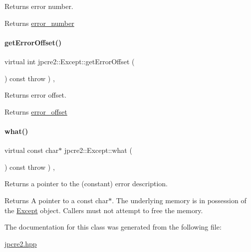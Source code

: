 Returns error number. 

\begin{DoxyReturn}{Returns}
\hyperlink{classjpcre2_1_1Except_aa72e1a71b4cdf1d4baecce57b63caafc}{error\+\_\+number} 
\end{DoxyReturn}
\hypertarget{classjpcre2_1_1Except_ade3963035e250d3cbf84ddaad2056fee_ade3963035e250d3cbf84ddaad2056fee}{}\label{classjpcre2_1_1Except_ade3963035e250d3cbf84ddaad2056fee_ade3963035e250d3cbf84ddaad2056fee} 
\paragraph{\texorpdfstring{get\+Error\+Offset()}{getErrorOffset()}}
{\footnotesize\ttfamily virtual int jpcre2\+::\+Except\+::get\+Error\+Offset (\begin{DoxyParamCaption}{ }\end{DoxyParamCaption}) const throw  ) \hspace{0.3cm}{\ttfamily [inline]}, {\ttfamily [virtual]}}



Returns error offset. 

\begin{DoxyReturn}{Returns}
\hyperlink{classjpcre2_1_1Except_a12b09693ebee9b4a8b981ec1bd7506c4}{error\+\_\+offset} 
\end{DoxyReturn}
\hypertarget{classjpcre2_1_1Except_aa16bdec8432ee950955f7ad81a9655bb_aa16bdec8432ee950955f7ad81a9655bb}{}\label{classjpcre2_1_1Except_aa16bdec8432ee950955f7ad81a9655bb_aa16bdec8432ee950955f7ad81a9655bb} 
\paragraph{\texorpdfstring{what()}{what()}}
{\footnotesize\ttfamily virtual const char$\ast$ jpcre2\+::\+Except\+::what (\begin{DoxyParamCaption}{ }\end{DoxyParamCaption}) const throw  ) \hspace{0.3cm}{\ttfamily [inline]}, {\ttfamily [virtual]}}



Returns a pointer to the (constant) error description. 

\begin{DoxyReturn}{Returns}
A pointer to a const char$\ast$. The underlying memory is in possession of the \hyperlink{classjpcre2_1_1Except}{Except} object. Callers must not attempt to free the memory. 
\end{DoxyReturn}


The documentation for this class was generated from the following file\+:\begin{DoxyCompactItemize}
\item 
\hyperlink{jpcre2_8hpp}{jpcre2.\+hpp}\end{DoxyCompactItemize}
